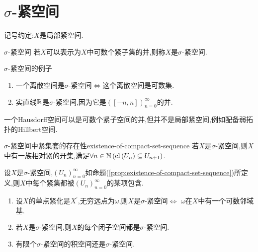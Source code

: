 \section{\texorpdfstring{$\sigma$}{sigma}-紧空间}

记号约定:$X$是局部紧空间.

\begin{definition}{$\sigma$-紧空间}{}
	若$X$可以表示为$X$中可数个紧子集的并,则称$X$是$\sigma$-紧空间.
\end{definition}

\begin{example}{$\sigma$-紧空间的例子}{}
	\begin{enumerate}
		\item 一个离散空间是$\sigma$-紧空间$\iff$这个离散空间是可数集.
		\item 实直线$\mathbb{R}$是$\sigma$-紧空间,因为它是$\left(\left[-n,n\right]\right)_{n=0}^{\infty}$的并.
	\end{enumerate}
\end{example}

\begin{remark}{}{}
	一个Hausdorff空间可以是可数个紧子空间的并,但并不是局部紧空间,例如配备弱拓扑的Hillbert空间.
\end{remark}

\begin{proposition}{$\sigma$-紧空间中紧集套的存在性}{existence-of-compact-set-sequence}
	若$X$是$\sigma$-紧空间,则$X$中有一族相对紧的开集,满足$\forall n\in\mathbb{N}\left(\operatorname{cl}\left(U_{n}\right)\subseteq U_{n+1}\right)$.
\end{proposition}

\begin{corollary}{}{}
	设$X$是$\sigma$-紧空间,$\left(U_{n}\right)_{n=0}^{\infty}$如命题(\ref{prop:existence-of-compact-set-sequence})所定义,则$X$中每个紧集都被$\left(U_{n}\right)_{n=0}^{\infty}$的某项包含.
\end{corollary}

\begin{remark}{}{}
	\begin{enumerate}
		\item 设$X$的单点紧化是$X^{\prime}$,无穷远点为$\omega$,则$X$是$\sigma$-紧空间$\iff$ $\omega$在$X$中有一个可数邻域基.
		\item 若$X$是$\sigma$-紧空间,则$X$的每个闭子空间都是$\sigma$-紧空间.
		\item 有限个$\sigma$-紧空间的积空间还是$\sigma$-紧空间.
	\end{enumerate}
\end{remark}

